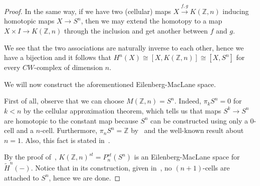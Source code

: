 \documentclass{article}
\newcommand{\numberset}{\mathbb}
\newcommand{\Z}{\numberset{Z}}
\newcommand{\exercise}[1]{\noindent {\bf Exercise #1}}
\begin{document}
\begin{proof}
    In the same way, if we have two (cellular) maps $X\xrightarrow{f,g} K(\Z,n)$
    inducing homotopic maps $X\rightarrow S^n$, then we may extend the homotopy
    to a map $X\times I\rightarrow K(\Z,n)$ through the inclusion and get
    another between $f$ and $g$.

    We see that the two associations are naturally inverse to each other, hence
    we have a bijection and it follows that $H^n(X)\cong[X,K(\Z,n)]\cong[X,S^n]$
    for every $CW$-complex of dimension $n$.

    We will now construct the aforementioned Eilenberg-MacLane space.

    First of all, observe that we can choose $M(\Z,n)=S^n$. Indeed, $\pi_kS^n=0$
    for $k<n$ by the cellular approximation theorem, which tells us that maps
    $S^k\rightarrow S^n$ are homotopic to the constant map because $S^n$ can be
    constructed using only a 0-cell and a $n$-cell. Furthermore, $\pi_nS^n=\Z$
    by~\cite[cor. 15.7]{Sag17} and the well-known result about $n=1$. Also, this
    fact is stated in~\cite[ex. 8.8]{HM19}.

    By the proof of~\cite[thm. 8.9]{HM19}, $K(\Z,n)^{st}=P_n^{st}(S^n)$ is an
    Eilenberg-MacLane space for $\tilde{H}^n(-)$. Notice that in its
    construction, given in~\cite[lemmaa 8.4]{HM19}, no $(n+1)$-cells are
    attached to $S^n$, hence we are done.
\end{proof}


~\\
\exercise{4}
\end{document}
